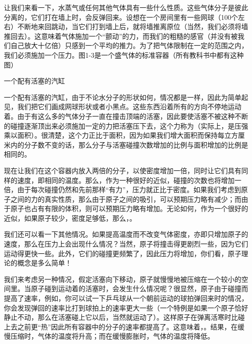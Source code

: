 \documentclass[11pt,oneside]{book}
\begin{document}
\begin{common-format}
让我们来看一下，水蒸气或任何其他气体具有一些什么性质。这些气体分子是彼此分离的，它们打在墙上时，会反弹回来。设想在一个房间里有一些网球（100个左右）不断地来回跳动，当它们打到墙上后，就将墙推离原位（当然，我们必须将墙推回去）。这意味着气体施加一个“颤动”的力，而我们的粗糙的感官（并没有被我们自己放大十亿倍）只感到一个平均的推力。为了把气体限制在一定的范围之内，我们必须施加一个压力。图1-3是一个盛气体的标准容器（所有教科书中都有这种图）
\begin{fig}{一个配有活塞的汽缸}
\label{fig:一个配有活塞的汽缸}
\end{fig}
一个配有活塞的汽缸，由于不论水分子的形状如何，情况都是一样，因此为简单起见，我们把它们画成网球形状或者小黑点。这些东西沿着所有的方向不停地运动着。由于有这么多的气体分子一直在撞击顶端的活塞，因此要使活塞不被这种不断的碰撞逐渐顶出来必须施加一定的力把活塞压下去，这个力称为（实际上，是压强乘以面积）。很清楚，这个力正比于面积，因为如果我们增大面积而保持每立方厘米内的分子数不变的话，那么分子与活塞碰撞次数增加的比例与面积增加的比例是相同的。

现在让我们在这个容器内放入两倍的分子，以使密度增加一倍，同时让它们具有同样的速度，即相同的温度。那么，作为一种很好的近似，碰撞的次数也将增加一倍，由于每次碰撞仍然和先前那样“有力”，压力就正比于密度。如果我们考虑到原子之间的力的真实性质，那么由于原子之间的吸引，可以预期压力略有减少；而由于原子也占有有限的体积，则可以预期压力略有增加。无论如何，作为一个很好的近似，如果原子较少，密度足够低，那么，。

我们还可以看一下其他情况。如果提高温度而不改变气体密度，亦即只增加原子的速度，那么在压力上会出现什么情况？当然，原子将撞击得更剧烈一些，因为它们运动得更快一些。此外，它们的碰撞更频繁了，因此压力将增加，你们看，原子理论的概念是多么简单！

我们来考虑另一种情况，假定活塞向下移动，原子就慢慢地被压缩在一个较小的空间里。当原子碰到运动着的活塞时，会发生什么情况呢？很显然，原子由于碰撞而提高了速率，例如，你可以试一下乒乓球从一个朝前运动的球拍弹回来时的情况，你会发现弹回的速率比打到球拍上的速率更大一些（一个特例是如果一个原子恰好静止不动，那么在活塞碰上它以后，当然就运动了）。这样原子在弹离活寒时比碰上去之前更“热”因此所有容器中的分子的速率都提高了。这意味着，。结果，在缓慢压缩时，气体的温度将升高；而在缓慢膨胀时，气体的温度将降低。


\end{common-format}
\end{document}
